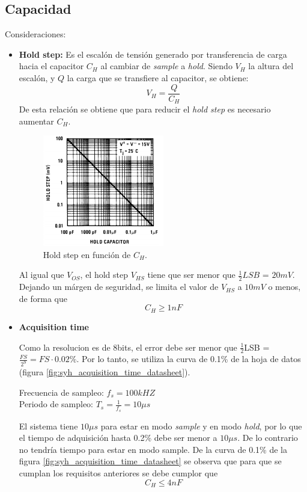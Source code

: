 \documentclass[../../ASSD_TP1_G7.tex]{subfiles}
\begin{document}
\subsection{Capacidad}
Consideraciones:
\begin{itemize}
	\item \textbf{Hold step:}
	Es el escal\'on de tensi\'on generado por transferencia de carga hacia el capacitor $C_H$ al cambiar de \textit{sample} a \textit{hold}. Siendo $V_H$ la altura del escal\'on, y $Q$ la carga que se transfiere al capacitor, se obtiene: 
	\[V_H = \frac{Q}{C_H}\]
	De esta relaci\'on se obtiene que para reducir el \textit{hold step} es necesario aumentar $C_H$.

		\begin{figure}[H]
			\centering
			\includegraphics[width = 0.5\textwidth]{figures/hold_step_datasheet.png}
			\caption{Hold step en funci\'on de $C_H$.}
			\label{fig:syh_hold_step_datasheet}
		\end{figure}

Al igual que $V_{OS}$, el hold step $V_{HS}$ tiene que ser menor que $\frac{1}{2} LSB$ = $20mV$. Dejando un m\'argen de seguridad, se limita el valor de $V_{HS}$ a $10mV$ o menos, de forma que \[ C_H \geqslant 1nF \]
	
	
	\item\textbf{Acquisition time}
	
Como la resolucion es de 8bits, el error debe ser menor que $\frac{1}{2}$LSB = $\frac{FS}{2^9} = FS \cdot 0.02\% $. Por lo tanto, se utiliza la curva de 0.1\% de la hoja de datos (figura \ref{fig:syh_acquisition_time_datasheet}).

Frecuencia de sampleo: $f_s = 100kHZ $ \\
Periodo de sampleo: $T_s = \frac{1}{f_s} = 10\mu s$


El sistema tiene $10\mu s$ para estar en modo \textit{sample} y en modo \textit{hold}, por lo que el tiempo de adquisici\'on hasta 0.2\% debe ser menor a $10\mu s$. De lo contrario no tendr\'ia tiempo para estar en modo sample. De la curva de 0.1\% de la figura \ref{fig:syh_acquisition_time_datasheet} se observa que para que se cumplan los requisitos anteriores se debe cumplor que \[C_H \leqslant 4nF\]


\end{itemize}
\end{document}
